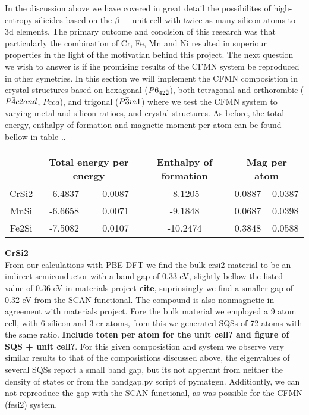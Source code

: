 In the discussion above we have covered in great detail the possibilites of high-entropy silicides based on the $\beta-$  unit cell with twice as many silicon atoms to 3d elements. The primary outcome and conclsion of this research was that particularly the combination of Cr, Fe, Mn and Ni resulted in superiour properties in the light of the motivatian behind this project. The next question we wish to answer is if ihe promising results of the CFMN system be reproduced in other symetries. In this section we will implement the CFMN composistion in crystal structures based on hexagonal  ($P6_{42\Bar{2}}$), both tetragonal and orthorombic  ($P\Bar{4}c2 and$, $Pcca$), and trigonal  ($P\Bar{3}m1$) where we test the CFMN system to varying metal and silicon ratioes, and crystal structures. As before, the total energy, enthalpy of formation and magnetic moment per atom can be found bellow in table ..
\begin{table}[h!]
\begin{tabular}{@{}cccccc@{}}
\toprule
            & \multicolumn{2}{c}{Total energy per energy} & Enthalpy of formation & \multicolumn{2}{c}{Mag per atom} \\ \midrule
CrSi2       & -6.4837               & 0.0087              & -8.1205             & 0.0887          & 0.0387         \\
MnSi        & -6.6658               & 0.0071              & -9.1848             & 0.0687          & 0.0398         \\
Fe2Si       & -7.5082               & 0.0107              & -10.2474            & 0.3848          & 0.0588         \\ \bottomrule
\end{tabular}
\end{table}

\textbf{CrSi2 \\}
From our calculations with PBE DFT we find the bulk crsi2 material to be an indirect semiconductor with a band gap of 0.33 eV, slightly bellow the listed value of 0.36 eV in materials project \textbf{cite}, suprinsingly we find a smaller gap of 0.32 eV from the SCAN functional. The compound is also nonmagnetic in agreement with materials project. Fore the bulk material we employed a 9 atom cell, with 6 silicon and 3 cr atoms, from this we generated SQSs of 72 atoms with the same ratio.  \textbf{Include toten per atom for the unit cell? and figure of SQS + unit cell?}. For this given composistion and system we observe very similar results to that of the composistions discussed above, the eigenvalues of several SQSs report a small band gap, but its not apperant from neither the density of states or from the bandgap.py script of pymatgen. Additiontly, we can not repreoduce the gap with the SCAN functional, as was possible for the CFMN (fesi2) system.   

